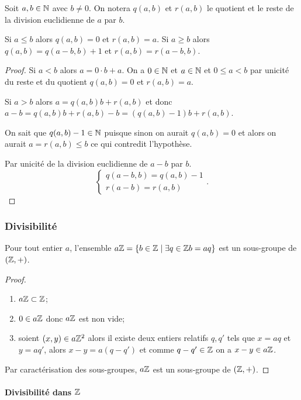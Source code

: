 Soit $a,b \in \mathbb{N}$ avec $b \neq 0$. On notera $q(a,b)$ et $r(a,b)$ le quotient et le reste de la division euclidienne de $a$ par $b$.

\begin{prop}
  Si $a \leqslant b$ alors $q(a,b)=0$ et $r(a,b)=a$. Si $a \geqslant b$ alors $q(a,b)=q(a-b,b)+1$ et $r(a,b)=r(a-b,b)$.
\end{prop}
\begin{proof}
  Si $a < b$ alors $a=0 \cdot b + a$. On a $0 \in \mathbb{N}$ et $a \in \mathbb{N}$ et $0 \leqslant a <b$ par unicité du reste et du quotient $q(a,b)=0$ et $r(a,b)=a$.

Si $a > b$ alors $a=q(a,b)b+r(a,b)$ et donc $a-b=q(a,b)b+r(a,b)-b=(q(a,b)-1)b+r(a,b)$.

On sait que $q(a,b)-1 \in \mathbb{N}$ puisque sinon on aurait $q(a,b) =0$ et alors on aurait $a=r(a,b) \leqslant b$ ce qui contredit l'hypothèse.

Par unicité de la division euclidienne de $a-b$ par $b$.
\begin{equation}
  \begin{cases}
    q(a-b,b) = q(a,b)-1 \\ r(a-b)=r(a,b)
  \end{cases}.
\end{equation}
\end{proof}

\subsubsection{Divisibilité}

\begin{prop}
  Pour tout entier $a$, l'ensemble $a\mathbb{Z}=\left\{b \in \mathbb{Z}\mathrel{}\middle|\mathrel{}\exists q \in \mathbb{Z} b=aq\right\}$ est un sous-groupe de $(\mathbb{Z},+)$.
\end{prop}
\begin{proof}
  \begin{enumerate}
  \item $a\mathbb{Z} \subset \mathbb{Z}$;
  \item $0 \in a\mathbb{Z}$ donc $a\mathbb{Z}$ est non vide;
  \item soient $(x,y) \in a\mathbb{Z}^2$ alors il existe deux entiers relatifs $q,q'$ tels que $x=aq$ et $y=aq'$, alors $x-y=a(q-q')$ et comme $q-q' \in \mathbb{Z}$ on a $x-y \in a\mathbb{Z}$.
  \end{enumerate}
Par caractérisation des sous-groupes, $a\mathbb{Z}$ est un sous-groupe de $(\mathbb{Z},+)$.
\end{proof}

\paragraph{Divisibilité dans $\mathbb{Z}$}

